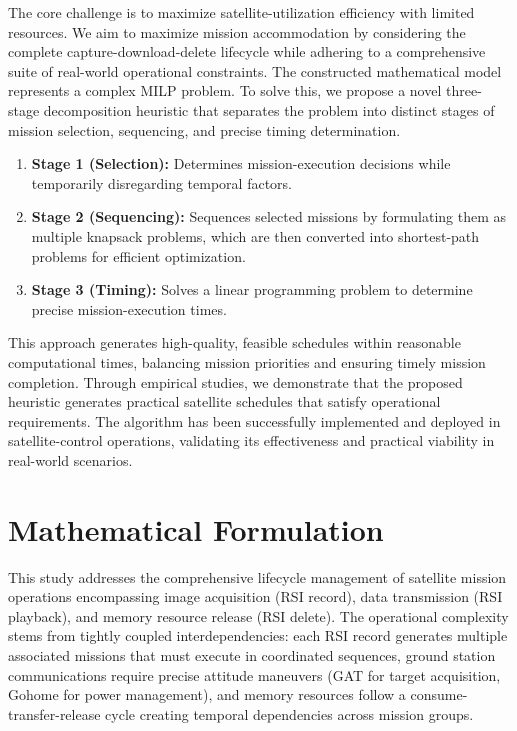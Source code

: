 \documentclass[preprint,3p,12pt,authoryear]{elsarticle}
\begin{document}
The core challenge is to maximize satellite-utilization efficiency with limited resources. We aim to maximize mission accommodation by considering the complete capture-download-delete lifecycle while adhering to a comprehensive suite of real-world operational constraints. The constructed mathematical model represents a complex MILP problem. To solve this, we propose a novel three-stage decomposition heuristic that separates the problem into distinct stages of mission selection, sequencing, and precise timing determination.
\begin{enumerate}
    \item \textbf{Stage 1 (Selection):} Determines mission-execution decisions while temporarily disregarding temporal factors.
    \item \textbf{Stage 2 (Sequencing):} Sequences selected missions by formulating them as multiple knapsack problems, which are then converted into shortest-path problems \citep{Dijkstra1959} for efficient optimization.
    \item \textbf{Stage 3 (Timing):} Solves a linear programming problem to determine precise mission-execution times.
\end{enumerate}
This approach generates high-quality, feasible schedules within reasonable computational times, balancing mission priorities and ensuring timely mission completion. Through empirical studies, we demonstrate that the proposed heuristic generates practical satellite schedules that satisfy operational requirements. The algorithm has been successfully implemented and deployed in satellite-control operations, validating its effectiveness and practical viability in real-world scenarios.


\section{Mathematical Formulation}


This study addresses the comprehensive lifecycle management of satellite mission operations encompassing image acquisition (RSI record), data transmission (RSI playback), and memory resource release (RSI delete). The operational complexity stems from tightly coupled interdependencies: each RSI record generates multiple associated missions that must execute in coordinated sequences, ground station communications require precise attitude maneuvers (GAT for target acquisition, Gohome for power management), and memory resources follow a consume-transfer-release cycle creating temporal dependencies across mission groups.
\end{document}

